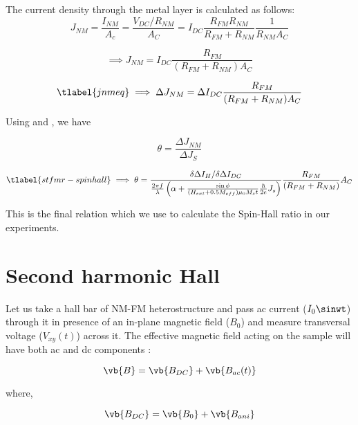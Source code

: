 The current density through the metal layer is calculated as follows:
\begin{equation}
        J_{NM} = \frac{I_{NM}}{A_{c}} = \frac{V_{DC}/R_{NM}}{A_{C}} 
        = I_{DC} \frac{R_{FM} R_{NM}}{R_{FM} + R_{NM}} \frac{1}{R_{NM} A_{C}}
\end{equation}

\begin{equation}
    \implies J_{NM} = I_{DC} \frac{R_{FM}}{(R_{FM} + R_{NM})A_C}
\end{equation}

\begin{equation}
    \tlabel{jnmeq}
    \implies \Delta J_{NM} = \Delta I_{DC} \frac{R_{FM}}{(R_{FM} + R_{NM})A_C}
\end{equation}


Using  and  , we have

\begin{equation}
    \theta = \frac{\Delta J_{NM}}{\Delta J_{S}}
\end{equation}

\begin{equation}
    \tlabel{stfmr-spinhall}
    \implies \theta = \frac{\delta \Delta I_{H}/\delta \Delta I_{DC}}{
        \frac{2\pi f}{\lambda} \left( 
        \alpha + \frac{\sin{\phi}}{(H_{ext} + 0.5M_{eff}) \mu_{0} M_{s} t} 
        \frac{\hbar}{2e}J_{s}
        \right)
    } \frac{R_{FM}}{(R_{FM} + R_{NM})}A_C
\end{equation}

This is the final relation which we use to calculate the Spin-Hall ratio in our experiments.

\section{Second harmonic Hall}

Let us take a hall bar of NM-FM heterostructure and pass ac current ($I_{0} \sinwt $) 
through it in presence of an in-plane magnetic field ($B_0$) and measure transversal voltage 
($V_{xy}(t)$) across it. The effective magnetic field acting on the sample will have both ac
 and dc components \cite{Avci2014f}:

\begin{equation}
    \vb{B} = \vb{B_{DC}} + \vb{B_{ac}(t)}
\end{equation}

where,

\begin{equation}
    \vb{B_{DC}} = \vb{B_0} + \vb{B_{ani}}
\end{equation}

